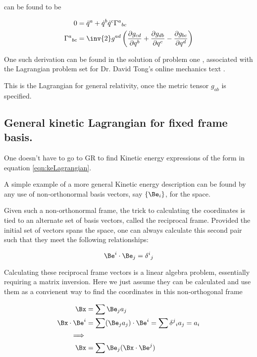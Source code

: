 \documentclass{article}      %
\newcommand{\PD}[2]{\frac{\partial {#2}}{\partial {#1}}}
\newcommand{\qdot}[0]{\dot{q}}
\newcommand{\qddot}[0]{\ddot{q}}
\begin{document}
can be found to be

\begin{align}
0
&= \qddot^a + \qdot^b \qdot^c {\Gamma^a}_{b c} \\
{\Gamma^a}_{b c} &= \inv{2} g^{a d} \left( 
\PD{q^b}{g_{c d}} 
+ \PD{q^c}{g_{d b}} 
- \PD{q^d}{g_{b c}} 
\right)
\end{align}

One such derivation can be found in
the solution of problem one \cite{PJTongMf1}, associated with the 
Lagrangian problem set for
Dr. David Tong's online mechanics text \cite{TongDynamics}.

This is the Lagrangian for general relativity, once the metric tensor $g_{a b}$ is specified.

\subsection{ General kinetic Lagrangian for fixed frame basis. }

One doesn't have to go to GR to find Kinetic energy expressions of the form in equation \ref{eqn:keLagrangian}.

A simple example of a more general Kinetic energy description can be found by any use of non-orthonormal basis vectors, say $\{\Be_i\}$,
for the space.

Given such a non-orthonormal frame, the trick to calculating the coordinates is tied to an alternate set of basis vectors, called the reciprocal frame.
Provided the initial set of vectors spans the space, one can always calculate this second pair such that they meet the following relationships:

\begin{equation*}
\Be^i \cdot \Be_j = {\delta^i}_j
\end{equation*}

Calculating these reciprocal frame vectors is a linear algebra problem, essentially requiring a matrix inversion.  Here we just assume they can be calculated and use them as a convienent way to find the coordinates in this non-orthogonal frame

\begin{align*}
\Bx &= \sum \Be_j a_j \\
\Bx \cdot \Be^i &= \sum (\Be_j a_j) \cdot \Be^i = \sum {\delta^j}_i a_j = a_i \\
\implies \\
\Bx &= \sum \Be_j (\Bx \cdot \Be^j)
\end{align*}
\end{document}
